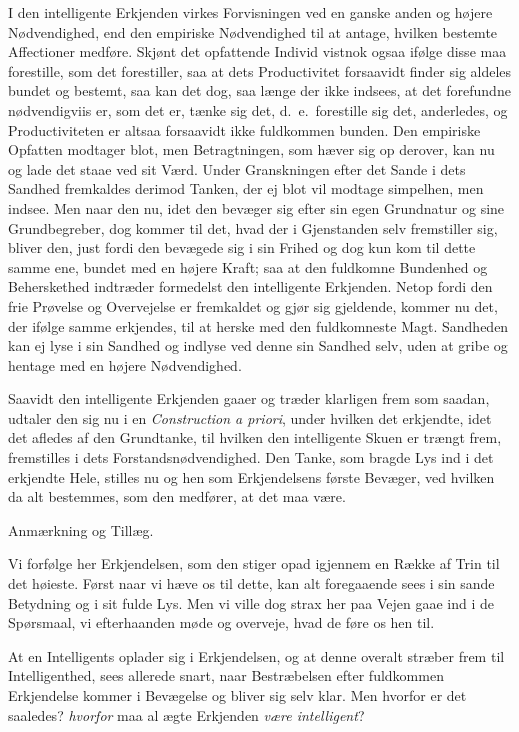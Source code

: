 \documentclass[12pt,a4paper]{book}
\newcommand{\apage}[1]{\marginnote{\footnotesize\textit{[#1]}}}
\begin{document}
I den intelligente Erkjenden virkes Forvisningen ved en ganske anden og højere
Nødvendighed, end den empiriske Nødvendighed til at antage, hvilken bestemte
Affectioner medføre. Skjønt det opfattende Individ vistnok ogsaa ifølge disse maa
forestille, som det forestiller, saa at dets Productivitet forsaavidt finder sig
aldeles bundet og bestemt, saa kan det dog, saa længe der ikke indsees, at det  \apage{58}
forefundne nødvendigviis er, som det er, tænke sig det, d.\ e.\ forestille sig
det, anderledes, og Productiviteten er altsaa forsaavidt ikke fuldkommen bunden.
Den empiriske Opfatten modtager blot, men Betragtningen, som hæver sig op derover,
kan nu og lade det staae ved sit Værd. Under Granskningen efter det Sande i dets
Sandhed fremkaldes derimod Tanken, der ej blot vil modtage simpelhen, men indsee.
Men naar den nu, idet den bevæger sig efter sin egen Grundnatur og sine
Grundbegreber, dog kommer til det, hvad der i Gjenstanden selv fremstiller sig,
bliver den, just fordi den bevægede sig i sin Frihed og dog kun kom til dette
samme ene, bundet med en højere Kraft; saa at den fuldkomne Bundenhed og
Beherskethed indtræder formedelst den intelligente Erkjenden. Netop fordi den frie
Prøvelse og Overvejelse er fremkaldet og gjør sig gjeldende, kommer nu det, der
ifølge samme erkjendes, til at herske med den fuldkomneste Magt. Sandheden kan ej
lyse i sin Sandhed og indlyse ved denne sin Sandhed selv, uden at gribe og
hentage med en højere Nødvendighed.

Saavidt den intelligente Erkjenden gaaer og træder klarligen frem som saadan,
udtaler den sig nu i en \emph{Construction a priori}, under hvilken det erkjendte,
idet det afledes af den Grundtanke, til hvilken den intelligente Skuen er trængt
frem, fremstilles i dets Forstandsnødvendighed. Den Tanke, som bragde Lys ind i
det erkjendte Hele, stilles nu og hen som Erkjendelsens første \apage{59} Bevæger, ved
hvilken da alt bestemmes, som den medfører, at det maa være.

\begin{center}Anmærkning og Tillæg.\end{center}

Vi forfølge her Erkjendelsen, som den stiger opad igjennem en Række af Trin til
det høieste. Først naar vi hæve os til dette, kan alt foregaaende sees i sin
sande Betydning og i sit fulde Lys. Men vi ville dog strax her paa Vejen gaae ind
i de Spørsmaal, vi efterhaanden møde og overveje, hvad de føre os hen til.

At en Intelligents oplader sig i Erkjendelsen, og at denne overalt stræber frem
til Intelligenthed, sees allerede snart, naar Bestræbelsen efter
fuldkommen Erkjendelse kommer i Bevægelse og bliver sig selv klar. Men hvorfor er
det saaledes? \emph{hvorfor} maa al ægte Erkjenden \emph{være intelligent}?%
\end{document}
